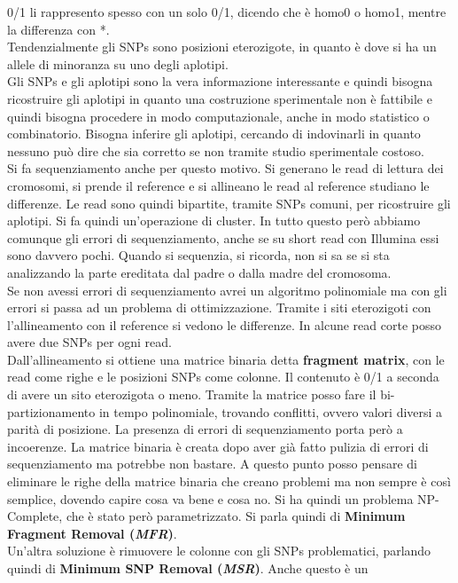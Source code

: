 \documentclass[a4paper,12pt, oneside]{book}
\begin{document}
0/1 li rappresento spesso con un solo 0/1, dicendo che è homo0 o homo1, mentre
la differenza con *.  \\
Tendenzialmente gli SNPs sono posizioni eterozigote, in quanto è dove si ha un
allele di minoranza su uno degli aplotipi.\\
Gli SNPs e gli aplotipi sono la vera informazione interessante e quindi bisogna
ricostruire gli aplotipi in quanto una costruzione sperimentale non è fattibile
e quindi bisogna procedere in modo computazionale, anche in modo statistico o
combinatorio. Bisogna inferire gli aplotipi, cercando di indovinarli in quanto
nessuno può dire che sia corretto se non tramite studio sperimentale costoso. \\
Si fa sequenziamento anche per questo motivo. Si generano le read di lettura dei
cromosomi, si prende il reference e si allineano le read al reference studiano
le differenze. Le read sono quindi bipartite, tramite SNPs comuni, per
ricostruire gli aplotipi. Si fa quindi un'operazione di cluster. In tutto questo
però abbiamo comunque gli errori di 
sequenziamento, anche se su short read con Illumina essi sono davvero
pochi. Quando si sequenzia, si ricorda, non si sa se si sta analizzando la parte
ereditata dal padre o dalla madre del cromosoma.\\ 
Se non avessi errori di sequenziamento avrei un algoritmo polinomiale ma con gli
errori si passa ad un problema di ottimizzazione. Tramite i siti eterozigoti con
l'allineamento con il reference si vedono le differenze. In alcune read corte
posso avere due SNPs per ogni read.\\
Dall'allineamento si ottiene una matrice binaria detta \textbf{fragment matrix},
con le read come righe e le posizioni SNPs come colonne. Il contenuto è 0/1 a
seconda di avere un sito eterozigota o meno. Tramite la matrice posso fare il
bi-partizionamento in tempo polinomiale, trovando conflitti, ovvero valori
diversi a parità di posizione. La presenza di errori di
sequenziamento porta però a incoerenze. La matrice binaria è creata dopo aver
già fatto pulizia di errori di sequenziamento ma potrebbe non bastare. A questo
punto posso pensare di eliminare le righe della matrice binaria che creano
problemi ma non sempre è così semplice, dovendo capire cosa va bene e cosa
no. Si ha quindi un problema NP-Complete, che è stato però parametrizzato. Si
parla quindi di \textbf{Minimum Fragment Removal (\textit{MFR})}.\\
Un'altra soluzione è rimuovere le colonne con gli SNPs problematici, parlando
quindi di \textbf{Minimum SNP Removal (\textit{MSR})}. Anche questo è un
\end{document}
